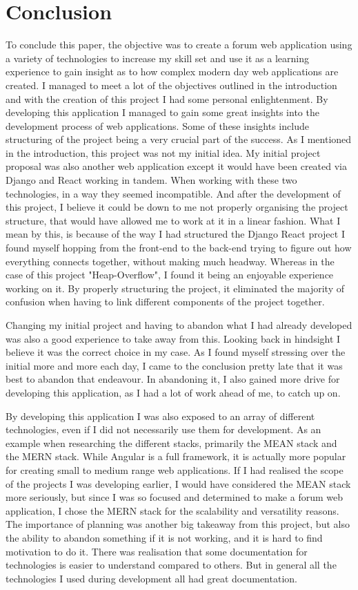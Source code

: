 \chapter{Conclusion}
To conclude this paper, the objective was to create a forum web application using a variety of technologies to increase my skill set and use it as a learning experience to gain insight as to how complex modern day web applications are created. I managed to meet a lot of the objectives outlined
in the introduction and with the creation of this project I had some personal enlightenment. By developing this application I managed to gain some great insights into the development process of web applications. Some of these insights include structuring of the project being a very crucial part of the success. As I mentioned in the introduction, this project was not my initial idea. My initial project proposal was also another web application except it would have been created via Django and React working in tandem. When working with these two technologies, in a way they seemed incompatible. And after the development of this project, I believe it could be down to me not properly organising the project structure, that would have allowed me to work at it in a linear fashion. What I mean by this, is because of the way I had structured the Django React project I found myself hopping from the front-end to the back-end trying to figure out how everything connects together, without making much headway. Whereas in the case of this project "Heap-Overflow", I found it being an enjoyable experience working on it. By properly structuring the project, it eliminated the majority of confusion when having to link different components of the project together.

Changing my initial project and having to abandon what I had already developed was also a good experience to take away from this. Looking back in hindsight I believe it was the correct choice in my case. As I found myself stressing over the initial more and more each day, I came to the conclusion pretty late that it was best to abandon that endeavour. In abandoning it, I also gained more drive for developing this application, as I had a lot of work ahead of me, to catch up on.

By developing this application I was also exposed to an array of different technologies, even if I did not necessarily use them for development. As an example when researching the different stacks, primarily the MEAN stack and the MERN stack. While Angular is a full framework, it is actually more popular for creating small to medium range web applications. If I had realised the scope of the projects I was developing earlier, I would have considered the MEAN stack more seriously, but since I was so focused and determined to make a forum web application, I chose the MERN stack for the scalability and versatility reasons. 
The importance of planning was another big takeaway from this project, but also the ability to abandon something if it is not working, and it is hard to find motivation to do it. There was realisation that some documentation for technologies is easier to understand compared to others. But in general all the technologies I used during development all had great documentation.

